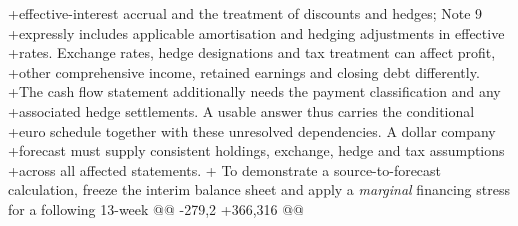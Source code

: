 +effective-interest accrual and the treatment of discounts and hedges; Note 9
+expressly includes applicable amortisation and hedging adjustments in effective
+rates. Exchange rates, hedge designations and tax treatment can affect profit,
+other comprehensive income, retained earnings and closing debt differently.
+The cash flow statement additionally needs the payment classification and any
+associated hedge settlements. A usable answer thus carries the conditional
+euro schedule together with these unresolved dependencies. A dollar company
+forecast must supply consistent holdings, exchange, hedge and tax assumptions
+across all affected statements.
+
 To demonstrate a source-to-forecast calculation, freeze the interim balance
 sheet and apply a \emph{marginal} financing stress for a following 13-week
@@ -279,2 +366,316 @@

